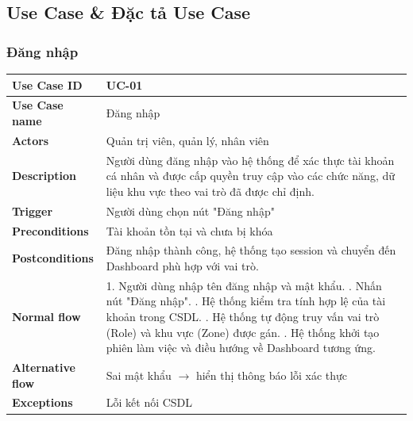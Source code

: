 \subsection{Use Case \& Đặc tả Use Case}

\subsubsection{Đăng nhập}
\begin{tabular}{|p{3.5cm}|p{9.5cm}|}
\hline
\textbf{Use Case ID} & UC-01 \\
\hline
\textbf{Use Case name} & Đăng nhập \\
\hline
\textbf{Actors} & Quản trị viên, quản lý, nhân viên \\
\hline
\textbf{Description} & 
Người dùng đăng nhập vào hệ thống để xác thực tài khoản cá nhân và được cấp quyền truy cập vào các chức năng, dữ liệu khu vực theo vai trò đã được chỉ định. \\
\hline
\textbf{Trigger} & Người dùng chọn nút "Đăng nhập" \\
\hline
\textbf{Preconditions} & Tài khoản tồn tại và chưa bị khóa \\
\hline
\textbf{Postconditions} & 
Đăng nhập thành công, hệ thống tạo session và chuyển đến Dashboard phù hợp với vai trò. \\
\hline
\textbf{Normal flow} & 1. Người dùng nhập tên đăng nhập và mật khẩu. \newline
2. Nhấn nút "Đăng nhập". \newline
3. Hệ thống kiểm tra tính hợp lệ của tài khoản trong CSDL. \newline
4. Hệ thống tự động truy vấn vai trò (Role) và khu vực (Zone) được gán. \newline
5. Hệ thống khởi tạo phiên làm việc và điều hướng về Dashboard tương ứng.\\
\hline
\textbf{Alternative flow} & 
Sai mật khẩu $\rightarrow$ hiển thị thông báo lỗi xác thực \\
\hline
\textbf{Exceptions} & Lỗi kết nối CSDL \\
\hline
\end{tabular}

